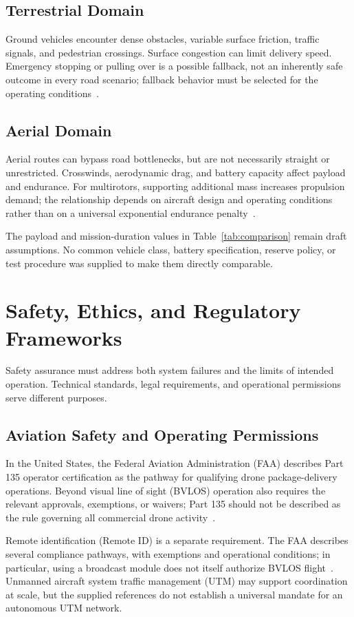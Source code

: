 \documentclass[11pt,a4paper]{article}
\begin{document}
\subsection{Terrestrial Domain}
Ground vehicles encounter dense obstacles, variable surface friction, traffic signals, and pedestrian crossings. Surface congestion can limit delivery speed. Emergency stopping or pulling over is a possible fallback, not an inherently safe outcome in every road scenario; fallback behavior must be selected for the operating conditions~\cite{nhtsa2017}.

\subsection{Aerial Domain}
Aerial routes can bypass road bottlenecks, but are not necessarily straight or unrestricted. Crosswinds, aerodynamic drag, and battery capacity affect payload and endurance. For multirotors, supporting additional mass increases propulsion demand; the relationship depends on aircraft design and operating conditions rather than on a universal exponential endurance penalty~\cite{stolaroff2018}.

The payload and mission-duration values in Table~\ref{tab:comparison} remain draft assumptions. No common vehicle class, battery specification, reserve policy, or test procedure was supplied to make them directly comparable.

\section{Safety, Ethics, and Regulatory Frameworks}
Safety assurance must address both system failures and the limits of intended operation. Technical standards, legal requirements, and operational permissions serve different purposes.

\subsection{Aviation Safety and Operating Permissions}
In the United States, the Federal Aviation Administration (FAA) describes Part 135 operator certification as the pathway for qualifying drone package-delivery operations. Beyond visual line of sight (BVLOS) operation also requires the relevant approvals, exemptions, or waivers; Part 135 should not be described as the rule governing all commercial drone activity~\cite{faaDelivery}.

Remote identification (Remote ID) is a separate requirement. The FAA describes several compliance pathways, with exemptions and operational conditions; in particular, using a broadcast module does not itself authorize BVLOS flight~\cite{faaRemoteID}. Unmanned aircraft system traffic management (UTM) may support coordination at scale, but the supplied references do not establish a universal mandate for an autonomous UTM network.
\end{document}

